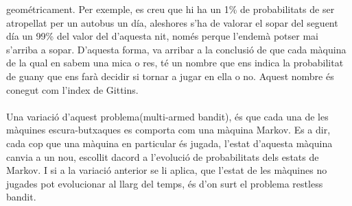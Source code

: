 geométricament. Per exemple, es creu que hi ha un 1\% de probabilitats de 
ser atropellat per un autobus un día, aleshores s'ha de valorar el sopar del
seguent día un 99\% del valor del d'aquesta nit, només perque l'endemà potser mai
s'arriba a sopar. D'aquesta forma, va arribar a la conclusió de que cada màquina 
de la qual en sabem una mica o res, té un nombre que ens indica la probabilitat
de guany que ens farà decidir si tornar a jugar en ella o no. Aquest
nombre és conegut com l'index de Gittins.\\\\
Una variació d'aquest problema(multi-armed bandit), és que cada una de 
les màquines escura-butxaques es comporta com una màquina Markov. Es a dir,
cada cop que una màquina en particular és jugada, l'estat d'aquesta màquina canvia
a un nou, escollit dacord a l'evolució de probabilitats dels estats de Markov.
I si a la variació anterior se li aplica, que l'estat de les màquines no jugades 
pot evolucionar al llarg del temps, és d'on surt el problema restless bandit.  

